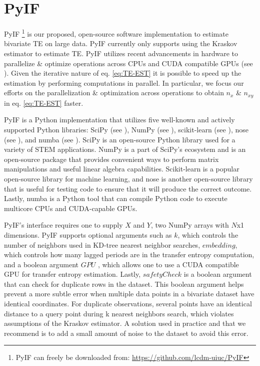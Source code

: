 \section{PyIF}

PyIF \footnote{PyIF can freely be downloaded from: \url{https://github.com/lcdm-uiuc/PyIF}} is our proposed, open-source software implementation to estimate bivariate TE on large data.  PyIF currently only supports using the Kraskov estimator to estimate TE.  PyIF utilizes recent advancements in hardware to parallelize \& optimize operations across CPUs and CUDA compatible GPUs (see  \cite{CUDA}).  Given the iterative nature of eq. \ref{eq:TE-EST} it is possible to speed up the estimation by performing computations in parallel. In particular, we focus our efforts on the parallelization \& optimization across operations to obtain \(n_x\)  \& \(n_{xy}\) in eq. \ref{eq:TE-EST} faster.



PyIF is a Python implementation that utilizes five well-known and actively supported Python libraries: SciPy (see \cite{scipy}),  NumPy (see \cite{numpy}), scikit-learn (see \cite{scikit-learn}),  nose (see \cite{nose}), and numba (see \cite{numba}).  SciPy is an open-source Python library used for a variety of STEM applications.  NumPy is a part of SciPy's ecosystem and is an open-source package that provides convenient ways to perform matrix manipulations and useful linear algebra capabilities.  Scikit-learn is a popular open-source library for machine learning, and nose is another open-source library that is useful for testing code to ensure that it will produce the correct outcome.  Lastly, numba is a Python tool that can compile Python code to execute multicore CPUs and CUDA-capable GPUs.


PyIF's interface requires one to supply \(X\) and \(Y\), two NumPy arrays with \(N\)x1 dimensions.  PyIF supports optional arguments such as \(k\), which controls the number of neighbors used in KD-tree nearest neighbor searches,  \(embedding\), which controls how many lagged periods are in the transfer entropy computation, and a boolean argument \(GPU\) , which allows one to use a CUDA compatible GPU for transfer entropy estimation.  Lastly, \(safetyCheck\) is a boolean argument that can check for duplicate rows in the dataset. This boolean argument helps prevent a more subtle error when multiple data points in a bivariate dataset have identical coordinates. For duplicate observations, several points have an identical distance to a query point during k nearest neighbors search, which violates assumptions of the Kraskov estimator. A solution used in practice and that we recommend is to add a small amount of noise to the dataset to avoid this error.


